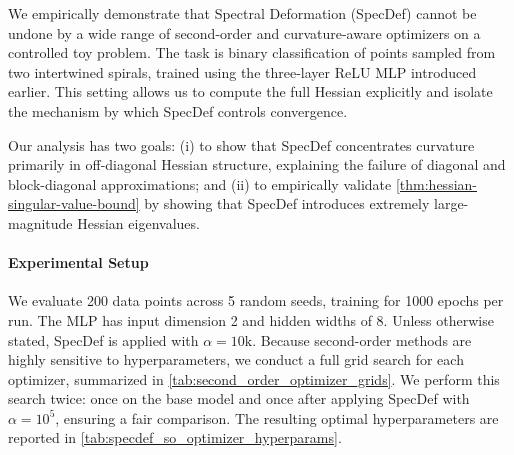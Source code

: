 \documentclass{article}
\theoremstyle{plain}
\theoremstyle{definition}
\theoremstyle{remark}
\begin{document}
We empirically demonstrate that Spectral Deformation (SpecDef) cannot be undone by a wide range of second-order and curvature-aware optimizers on a controlled toy problem. The task is binary classification of points sampled from two intertwined spirals, trained using the three-layer ReLU MLP introduced earlier. This setting allows us to compute the full Hessian explicitly and isolate the mechanism by which SpecDef controls convergence.

Our analysis has two goals:  
(i) to show that SpecDef concentrates curvature primarily in off-diagonal Hessian structure, explaining the failure of diagonal and block-diagonal approximations; and  
(ii) to empirically validate \cref{thm:hessian-singular-value-bound} by showing that SpecDef introduces extremely large-magnitude Hessian eigenvalues.

\paragraph{Experimental Setup}
We evaluate 200 data points across 5 random seeds, training for 1000 epochs per run. The MLP has input dimension 2 and hidden widths of 8. Unless otherwise stated, SpecDef is applied with $\alpha = 10\mathrm{k}$. Because second-order methods are highly sensitive to hyperparameters, we conduct a full grid search for each optimizer, summarized in \cref{tab:second_order_optimizer_grids}. We perform this search twice: once on the base model and once after applying SpecDef with $\alpha = 10^5$, ensuring a fair comparison. The resulting optimal hyperparameters are reported in \cref{tab:specdef_so_optimizer_hyperparams}.
\end{document}
